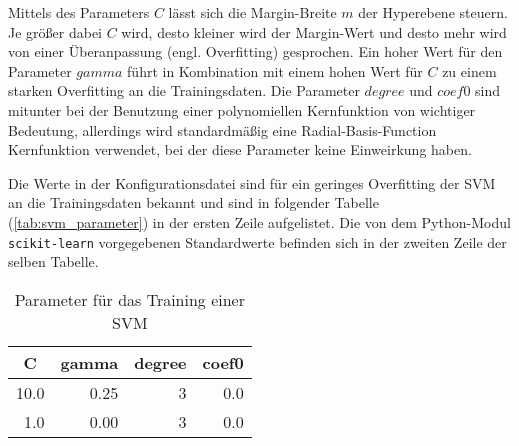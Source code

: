 Mittels des Parameters $C$ lässt sich die Margin-Breite $m$ der Hyperebene steuern.
Je größer dabei $C$ wird, desto kleiner wird der Margin-Wert und desto mehr wird von einer Überanpassung (engl. Overfitting) gesprochen.
Ein hoher Wert für den Parameter $gamma$ führt in Kombination mit einem hohen Wert für $C$ zu einem starken Overfitting an die Trainingsdaten.
Die Parameter $degree$ und $coef0$ sind mitunter bei der Benutzung einer polynomiellen Kernfunktion von wichtiger Bedeutung, allerdings wird standardmäßig eine Radial-Basis-Function Kernfunktion verwendet, bei der diese Parameter keine Einweirkung haben.

Die Werte in der Konfigurationsdatei sind für ein geringes Overfitting der \ac{SVM} an die Trainingsdaten bekannt und sind in folgender Tabelle (\autoref{tab:svm_parameter}) in der ersten Zeile aufgelistet.
Die von dem Python-Modul \texttt{scikit-learn} vorgegebenen Standardwerte befinden sich in der zweiten Zeile der selben Tabelle.
\begin{table}[h]
\centering
\begin{tabular}{rrrr}
\hline
  \multicolumn{1}{c}{\textbf{C}} & \multicolumn{1}{c}{\textbf{gamma}} & \multicolumn{1}{c}{\textbf{degree}} & \multicolumn{1}{c}{\textbf{coef0}} \\
 \hline
  10.0 & 0.25 & 3 & 0.0 \\
\hline
1.0 & 0.00 & 3 & 0.0 \\
 \hline
\end{tabular}
\caption[Parameter für das Training einer SVM]{Parameter für das Training einer SVM}
\label{tab:svm_parameter}
\end{table}

